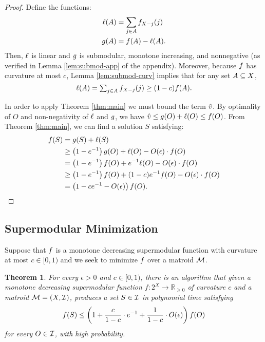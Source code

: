 \documentclass{article}
\newcommand{\reals}{\ensuremath{\mathbb{R}}}
\newcommand{\posreals}{\ensuremath{\reals_{\ge 0}}}
\newtheorem{theorem}{Theorem}[section]
\theoremstyle{definition}
\begin{document}
\begin{proof}
Define the functions:
\begin{align*}
\ell(A) &= \sum_{j \in A}f_{X - j}(j) \\
g(A) &= f(A) - \ell(A).
\end{align*}
Then, $\ell$ is linear and $g$ is submodular, monotone increasing, and nonnegative (as verified in Lemma \ref{lem:submod-app} of the appendix).  Moreover, because $f$ has curvature at most $c$, Lemma \ref{lem:submod-curv} implies that for any set $A \subseteq X$, $$\textstyle \ell(A) = \sum_{j \in A}f_{X - j}(j) \ge (1 - c)f(A).$$

In order to apply Theorem \ref{thm:main} we must bound the term $\hat{v}$.  By optimality of $O$ and non-negativity of $\ell$ and $g$, we have $\hat{v} \le g(O) + \ell(O) \le f(O)$.  From Theorem \ref{thm:main}, we can find a solution $S$ satisfying:
\begin{align*}
f(S) &= g(S) + \ell(S) \\
&\ge \left(1 - e^{-1}\right)g(O) + \ell(O) - O(\epsilon)\cdot f(O) \\
           &= \left(1 - e^{-1}\right)f(O) + e^{-1}\ell(O) - O(\epsilon) \cdot f(O) \\
           &\ge \left(1 - e^{-1}\right)f(O) + (1-c)e^{-1}f(O) - O(\epsilon) \cdot f(O) \\
           &= \left(1 - ce^{-1} - O(\epsilon)\right)f(O).
\end{align*}
\end{proof}


\subsection{Supermodular Minimization}
\label{sec:superm-minim}

Suppose that $f$ is a monotone decreasing supermodular function with curvature at most $c \in [0,1)$ and we seek to minimize $f$ over a matroid $\mathcal{M}$. 

\begin{theorem}
\label{thm:supermod-main}
For every $\epsilon > 0$ and $c \in [0,1)$, there is an algorithm that given a monotone decreasing supermodular function $f:2^X \rightarrow \posreals$ of curvature $c$ and a matroid $\mathcal{M} = (X,\mathcal{I})$, produces a set $S \in \mathcal{I}$ in polynomial time satisfying
\begin{equation*}
f(S) \leq \left(1 + \frac{c}{1-c} \cdot e^{-1} + \frac{1}{1-c}\cdot O(\epsilon) \right) f(O)
\end{equation*}
for every $O \in \mathcal{I}$, with high probability.
\end{theorem}
\end{document}
